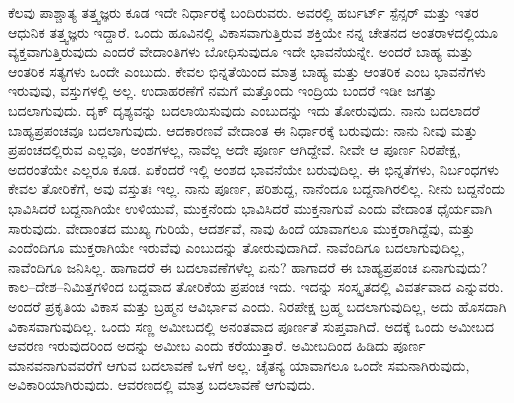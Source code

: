 ಕೆಲವು ಪಾಶ್ಚಾತ್ಯ ತತ್ತ್ವಜ್ಞರು ಕೂಡ ಇದೇ ನಿರ್ಧಾರಕ್ಕೆ ಬಂದಿರುವರು. ಅವರಲ್ಲಿ ಹರ್ಬರ್ಟ್ ಸ್ಪೆನ್ಸರ್ ಮತ್ತು ಇತರ ಆಧುನಿಕ ತತ್ತ್ವಜ್ಞರು ಇದ್ದಾರೆ. ಒಂದು ಹೂವಿನಲ್ಲಿ ವಿಕಾಸವಾಗುತ್ತಿರುವ ಶಕ್ತಿಯೇ ನನ್ನ ಚೇತನದ ಅಂತರಾಳದಲ್ಲಿಯೂ ವ್ಯಕ್ತವಾಗುತ್ತಿರುವುದು ಎಂದರೆ ವೇದಾಂತಿಗಳು ಬೋಧಿಸುವುದೂ ಇದೇ ಭಾವನೆಯನ್ನೇ. ಅಂದರೆ ಬಾಹ್ಯ ಮತ್ತು ಆಂತರಿಕ ಸತ್ಯಗಳು ಒಂದೇ ಎಂಬುದು. ಕೇವಲ ಭಿನ್ನತೆಯಿಂದ ಮಾತ್ರ ಬಾಹ್ಯ ಮತ್ತು ಆಂತರಿಕ ಎಂಬ ಭಾವನೆಗಳು ಇರುವುವು, ವಸ್ತುಗಳಲ್ಲಿ ಅಲ್ಲ. ಉದಾಹರಣೆಗೆ ನಮಗೆ ಮತ್ತೊಂದು ಇಂದ್ರಿಯ ಬಂದರೆ ಇಡೀ ಜಗತ್ತು ಬದಲಾಗುವುದು. ದೃಕ್ ದೃಶ್ಯವನ್ನು ಬದಲಾಯಿಸುವುದು ಎಂಬುದನ್ನು ಇದು ತೋರುವುದು. ನಾನು ಬದಲಾದರೆ ಬಾಹ್ಯಪ್ರಪಂಚವೂ ಬದಲಾಗುವುದು. ಆದಕಾರಣವೆ ವೇದಾಂತ ಈ ನಿರ್ಧಾರಕ್ಕೆ ಬರುವುದು: ನಾನು ನೀವು ಮತ್ತು ಪ್ರಪಂಚದಲ್ಲಿರುವ ಎಲ್ಲವೂ, ಅಂಶಗಳಲ್ಲ, ನಾವೆಲ್ಲ ಅದೇ ಪೂರ್ಣ ಆಗಿದ್ದೇವೆ. ನೀವೇ ಆ ಪೂರ್ಣ ನಿರಪೇಕ್ಷ, ಅದರಂತೆಯೇ ಎಲ್ಲರೂ ಕೂಡ. ಏಕೆಂದರೆ ಇಲ್ಲಿ ಅಂಶದ ಭಾವನೆಯೇ ಬರುವುದಿಲ್ಲ. ಈ ಭಿನ್ನತೆಗಳು, ನಿರ್ಬಂಧಗಳು ಕೇವಲ ತೋರಿಕೆಗೆ, ಅವು ವಸ್ತುತಃ ಇಲ್ಲ. ನಾನು ಪೂರ್ಣ, ಪರಿಶುದ್ದ, ನಾನೆಂದೂ ಬದ್ದನಾಗಿರಲಿಲ್ಲ. ನೀನು ಬದ್ದನೆಂದು ಭಾವಿಸಿದರೆ ಬದ್ದನಾಗಿಯೇ ಉಳಿಯುವೆ, ಮುಕ್ತನೆಂದು ಭಾವಿಸಿದರೆ ಮುಕ್ತನಾಗುವೆ ಎಂದು ವೇದಾಂತ ಧೈರ್ಯವಾಗಿ ಸಾರುವುದು. ವೇದಾಂತದ ಮುಖ್ಯ ಗುರಿಯೆ, ಆದರ್ಶವೆ, ನಾವು ಹಿಂದೆ ಯಾವಾಗಲೂ ಮುಕ್ತರಾಗಿದ್ದೆವು, ಮತ್ತು ಎಂದೆಂದಿಗೂ ಮುಕ್ತರಾಗಿಯೇ ಇರುವೆವು ಎಂಬುದನ್ನು ತೋರುವುದಾಗಿದೆ. ನಾವೆಂದಿಗೂ ಬದಲಾಗುವುದಿಲ್ಲ, ನಾವೆಂದಿಗೂ ಜನಿಸಿಲ್ಲ. ಹಾಗಾದರೆ ಈ ಬದಲಾವಣೆಗಳೆಲ್ಲ ಏನು? ಹಾಗಾದರೆ ಈ ಬಾಹ್ಯಪ್ರಪಂಚ ಏನಾಗುವುದು? ಕಾಲ–ದೇಶ–ನಿಮಿತ್ತಗಳಿಂದ ಬದ್ದವಾದ ತೋರಿಕೆಯ ಪ್ರಪಂಚ ಇದು. ಇದನ್ನು ಸಂಸ್ಕೃತದಲ್ಲಿ ವಿವರ್ತವಾದ ಎನ್ನುವರು. ಅಂದರೆ ಪ್ರಕೃತಿಯ ವಿಕಾಸ ಮತ್ತು ಬ್ರಹ್ಮನ ಆವಿರ್ಭಾವ ಎಂದು. ನಿರಪೇಕ್ಷ ಬ್ರಹ್ಮ ಬದಲಾಗುವುದಿಲ್ಲ, ಅದು ಹೊಸದಾಗಿ ವಿಕಾಸವಾಗುವುದಿಲ್ಲ. ಒಂದು ಸಣ್ಣ ಅಮೀಬದಲ್ಲಿ ಅನಂತವಾದ ಪೂರ್ಣತೆ ಸುಪ್ತವಾಗಿದೆ. ಅದಕ್ಕೆ ಒಂದು ಅಮೀಬದ ಆವರಣ ಇರುವುದರಿಂದ ಅದನ್ನು ಅಮೀಬ ಎಂದು ಕರೆಯುತ್ತಾರೆ. ಅಮೀಬದಿಂದ ಹಿಡಿದು ಪೂರ್ಣ ಮಾನವನಾಗುವವರೆಗೆ ಆಗುವ ಬದಲಾವಣೆ ಒಳಗೆ ಅಲ್ಲ. ಚೈತನ್ಯ ಯಾವಾಗಲೂ ಒಂದೇ ಸಮನಾಗಿರುವುದು, ಅವಿಕಾರಿಯಾಗಿರುವುದು. ಆವರಣದಲ್ಲಿ ಮಾತ್ರ ಬದಲಾವಣೆ ಆಗುವುದು.

